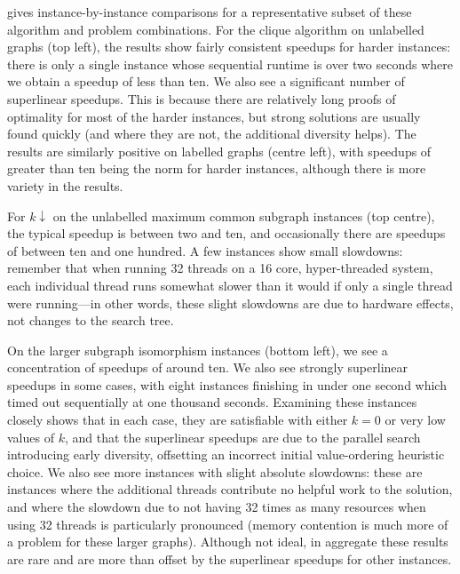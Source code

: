 \documentclass{llncs}
\begin{document}
 gives instance-by-instance comparisons for a representative subset of
these algorithm and problem combinations. For the clique algorithm on unlabelled graphs (top left),
the results show fairly consistent speedups for harder instances: there is only a single instance
whose sequential runtime is over two seconds where we obtain a speedup of less than ten. We also see
a significant number of superlinear speedups. This is because there are relatively long proofs of
optimality for most of the harder instances, but strong solutions are usually found quickly (and
where they are not, the additional diversity helps). The results are similarly positive on
labelled graphs (centre left), with speedups of greater than ten being the norm for harder
instances, although there is more variety in the results.

For $k{\downarrow}$ on the unlabelled maximum common subgraph instances (top centre), the typical speedup
is between two and ten, and occasionally there are speedups of between ten and one hundred. A few
instances show small slowdowns: remember that when running 32 threads on a 16 core, hyper-threaded
system, each individual thread runs somewhat slower than it would if only a single thread were
running---in other words, these slight slowdowns are due to hardware effects, not changes to the
search tree.

On the larger subgraph isomorphism instances (bottom left), we see a concentration of speedups
of around ten. We also see strongly superlinear speedups in some cases, with eight
instances finishing in under one second which timed out sequentially at one thousand seconds.
Examining these instances closely shows that in each case, they are satisfiable with either $k = 0$
or very low values of $k$, and that the superlinear speedups are due to the parallel search
introducing early diversity, offsetting an incorrect initial value-ordering heuristic choice. We
also see more instances with slight absolute slowdowns: these are instances where the additional
threads contribute no helpful work to the solution, and where the slowdown due to not having 32
times as many resources when using 32 threads is particularly pronounced (memory contention is much
more of a problem for these larger graphs). Although not ideal, in aggregate these results are rare
and are more than offset by the superlinear speedups for other instances.
\end{document}
